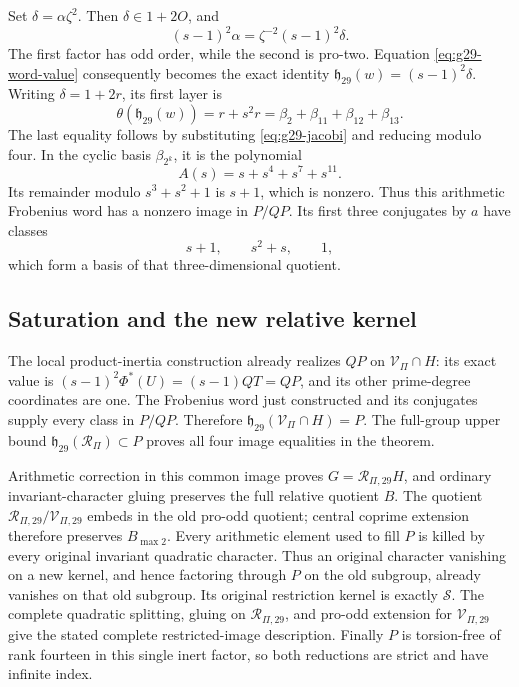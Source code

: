 Set \(\delta=\alpha\zeta^2\). Then \(\delta\in1+2O\), and
\[
              (s-1)^2\alpha=\zeta^{-2}(s-1)^2\delta.
\]
The first factor has odd order, while the second is pro-two.
Equation \eqref{eq:g29-word-value} consequently becomes the exact
identity \(\mathfrak h_{29}(w)=(s-1)^2\delta\).
Writing \(\delta=1+2r\), its first layer is
\[
 \theta(\mathfrak h_{29}(w))=r+s^2r
                   =\beta_2+\beta_{11}+\beta_{12}+\beta_{13}.
\]
The last equality follows by substituting
\eqref{eq:g29-jacobi} and reducing modulo four. In the cyclic
basis \(\beta_{2^k}\), it is the polynomial
\[
                   A(s)=s+s^4+s^7+s^{11}.
\]
Its remainder modulo \(s^3+s^2+1\) is \(s+1\), which is
nonzero. Thus this arithmetic Frobenius word has a
nonzero image in \(P/QP\). Its first three conjugates by \(a\)
have classes
\[
                        s+1,\qquad s^2+s,\qquad 1,
\]
which form a basis of that three-dimensional quotient.

\subsection{Saturation and the new relative kernel}

The local product-inertia construction already realizes \(QP\)
on \(\mathcal V_\Pi\cap H\): its exact value is
\((s-1)^2\Phi^*(U)=(s-1)QT=QP\), and its other
prime-degree coordinates are one. The Frobenius word just
constructed and its conjugates supply every class in \(P/QP\).
Therefore \(\mathfrak h_{29}(\mathcal V_\Pi\cap H)=P\).
The full-group upper bound \(\mathfrak h_{29}(\mathcal R_\Pi)\subset P\)
proves all four image equalities in the theorem.

Arithmetic correction in this common image proves
\(G=\mathcal R_{\Pi,29}H\), and ordinary invariant-character gluing
preserves the full relative quotient \(B\). The quotient
\(\mathcal R_{\Pi,29}/\mathcal V_{\Pi,29}\) embeds in the old pro-odd quotient;
central coprime extension therefore preserves \(B_{\max2}\).
Every arithmetic element used to fill \(P\) is killed by every
original invariant quadratic character. Thus an original character
vanishing on a new kernel, and hence factoring through \(P\)
on the old subgroup, already vanishes on that old subgroup.
Its original restriction kernel is exactly \(\mathcal S\).
The complete quadratic splitting, gluing on \(\mathcal R_{\Pi,29}\), and
pro-odd extension for \(\mathcal V_{\Pi,29}\) give the stated complete
restricted-image description. Finally \(P\) is torsion-free of
rank fourteen in this single inert factor, so both reductions are
strict and have infinite index.
